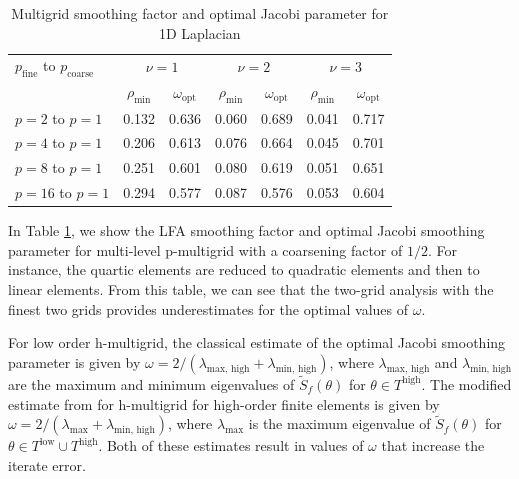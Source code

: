 \documentclass[review]{siamart190516}
\begin{document}
\begin{table}[ht!]
\begin{center}
\begin{tabular}{l cc cc cc}
  \toprule
  $p_{\text{fine}}$ to $p_{\text{coarse}}$  &  \multicolumn{2}{c}{$\nu = 1$}          &  \multicolumn{2}{c}{$\nu = 2$}            &  \multicolumn{2}{c}{$\nu = 3$}          \\
                                            &  $\rho_{\min}$ & $\omega_{\text{opt}}$  &  $\rho_{\min}$  &  $\omega_{\text{opt}}$  &  $\rho_{\min}$ & $\omega_{\text{opt}}$  \\
  \midrule
  $p = 2$ to $p = 1$          &  0.132 & 0.636  &  0.060 & 0.689  &  0.041 & 0.717   \\
  $p = 4$ to $p = 1$          &  0.206 & 0.613  &  0.076 & 0.664  &  0.045 & 0.701   \\
  $p = 8$ to $p = 1$          &  0.251 & 0.601  &  0.080 & 0.619  &  0.051 & 0.651   \\
  $p = 16$ to $p = 1$         &  0.294 & 0.577  &  0.087 & 0.576  &  0.053 & 0.604   \\
  \bottomrule
\end{tabular}
\end{center}
\caption{Multigrid smoothing factor and optimal Jacobi parameter for 1D Laplacian}
\label{table:multi_grid_1d}
\end{table}

In Table \ref{table:multi_grid_1d}, we show the LFA smoothing factor and optimal Jacobi smoothing parameter for multi-level p-multigrid with a coarsening factor of $1/2$.
For instance, the quartic elements are reduced to quadratic elements and then to linear elements.
From this table, we can see that the two-grid analysis with the finest two grids provides underestimates for the optimal values of $\omega$.

For low order h-multigrid, the classical estimate of the optimal Jacobi smoothing parameter is given by $\omega = 2 / \left( \lambda_{\text{max, high}} + \lambda_{\text{min, high}} \right)$, where $\lambda_{\text{max, high}}$ and $\lambda_{\text{min, high}}$ are the maximum and minimum eigenvalues of $\tilde{S}_f \left( \theta \right)$ for $\theta \in T^{\text{high}}$.
The modified estimate from \cite{he2020two} for h-multigrid for high-order finite elements is given by $\omega = 2 / \left( \lambda_{\text{max}} + \lambda_{\text{min, high}} \right)$, where $\lambda_{\text{max}}$ is the maximum eigenvalue of $\tilde{S}_f \left( \theta \right)$ for $\theta \in T^{\text{low}} \cup T^{\text{high}}$.
Both of these estimates result in values of $\omega$ that increase the iterate error.
\end{document}

